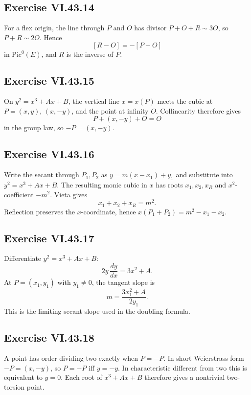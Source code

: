 \subsection*{Exercise VI.43.14}
\begin{solution}
For a flex origin, the line through \(P\) and \(O\) has divisor \(P+O+R\sim3O\), so \(P+R\sim2O\).  Hence
\[
[R-O]=-[P-O]
\]
in \(\mathrm{Pic}^0(E)\), and \(R\) is the inverse of \(P\).
\end{solution}

\subsection*{Exercise VI.43.15}
\begin{solution}
On \(y^2=x^3+Ax+B\), the vertical line \(x=x(P)\) meets the cubic at \(P=(x,y)\), \((x,-y)\), and the point at infinity \(O\).  Collinearity therefore gives
\[
P+(x,-y)+O=O
\]
in the group law, so \(-P=(x,-y)\).
\end{solution}

\subsection*{Exercise VI.43.16}
\begin{solution}
Write the secant through \(P_1,P_2\) as \(y=m(x-x_1)+y_1\) and substitute into \(y^2=x^3+Ax+B\).  The resulting monic cubic in \(x\) has roots \(x_1,x_2,x_R\) and \(x^2\)-coefficient \(-m^2\).  Vieta gives
\[
x_1+x_2+x_R=m^2.
\]
Reflection preserves the \(x\)-coordinate, hence \(x(P_1+P_2)=m^2-x_1-x_2\).
\end{solution}

\subsection*{Exercise VI.43.17}
\begin{solution}
Differentiate \(y^2=x^3+Ax+B\):
\[
2y\,\frac{dy}{dx}=3x^2+A.
\]
At \(P=(x_1,y_1)\) with \(y_1\neq0\), the tangent slope is
\[
m=\frac{3x_1^2+A}{2y_1}.
\]
This is the limiting secant slope used in the doubling formula.
\end{solution}

\subsection*{Exercise VI.43.18}
\begin{solution}
A point has order dividing two exactly when \(P=-P\).  In short Weierstrass form \(-P=(x,-y)\), so \(P=-P\) iff \(y=-y\).  In characteristic different from two this is equivalent to \(y=0\).  Each root of \(x^3+Ax+B\) therefore gives a nontrivial two-torsion point.
\end{solution}

